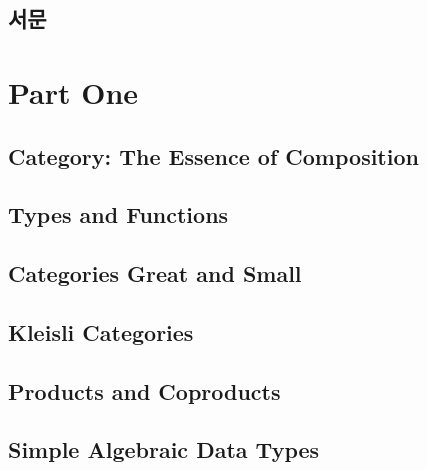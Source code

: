 


\frontmatter
\tableofcontents


\chapter*{서문}
\label{서문}


\mainmatter

\part*{Part One}

\chapter{Category: The Essence of Composition}\label{category-the-essence-of-composition}


\chapter{Types and Functions}\label{types-and-functions}


\chapter{Categories Great and Small}\label{categories-great-and-small}


\chapter{Kleisli Categories}\label{kleisli-categories}


\chapter{Products and Coproducts}\label{products-and-coproducts}


\chapter{Simple Algebraic Data Types}\label{simple-algebraic-data-types}


